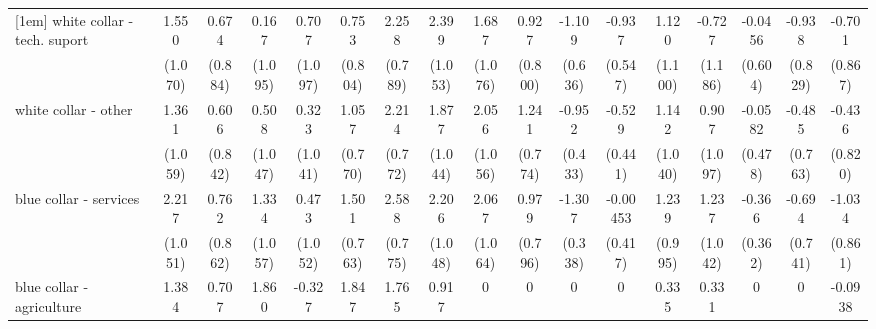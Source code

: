 {\begin{tabular}{l*{16}{c}}
[1em]
white collar - tech. suport&       1.550         &       0.674         &       0.167         &       0.707         &       0.753         &       2.258\sym{**} &       2.399\sym{*}  &       1.687         &       0.927         &      -1.109         &      -0.937         &       1.120         &      -0.727         &     -0.0456         &      -0.938         &      -0.701         \\
                    &     (1.070)         &     (0.884)         &     (1.095)         &     (1.097)         &     (0.804)         &     (0.789)         &     (1.053)         &     (1.076)         &     (0.800)         &     (0.636)         &     (0.547)         &     (1.100)         &     (1.186)         &     (0.604)         &     (0.829)         &     (0.867)         \\
[1em]
white collar - other&       1.361         &       0.606         &       0.508         &       0.323         &       1.057         &       2.214\sym{**} &       1.877         &       2.056         &       1.241         &      -0.952\sym{*}  &      -0.529         &       1.142         &       0.907         &     -0.0582         &      -0.485         &      -0.436         \\
                    &     (1.059)         &     (0.842)         &     (1.047)         &     (1.041)         &     (0.770)         &     (0.772)         &     (1.044)         &     (1.056)         &     (0.774)         &     (0.433)         &     (0.441)         &     (1.040)         &     (1.097)         &     (0.478)         &     (0.763)         &     (0.820)         \\
[1em]
blue collar - services&       2.217\sym{*}  &       0.762         &       1.334         &       0.473         &       1.501\sym{*}  &       2.588\sym{***}&       2.206\sym{*}  &       2.067         &       0.979         &      -1.307\sym{***}&    -0.00453         &       1.239         &       1.237         &      -0.366         &      -0.694         &      -1.034         \\
                    &     (1.051)         &     (0.862)         &     (1.057)         &     (1.052)         &     (0.763)         &     (0.775)         &     (1.048)         &     (1.064)         &     (0.796)         &     (0.338)         &     (0.417)         &     (0.995)         &     (1.042)         &     (0.362)         &     (0.741)         &     (0.861)         \\
[1em]
blue collar - agriculture&       1.384         &       0.707         &       1.860         &      -0.327         &       1.847         &       1.765         &       0.917         &           0         &           0         &           0         &           0         &       0.335         &       0.331         &           0         &           0         &     -0.0938         \\

\end{tabular}}
